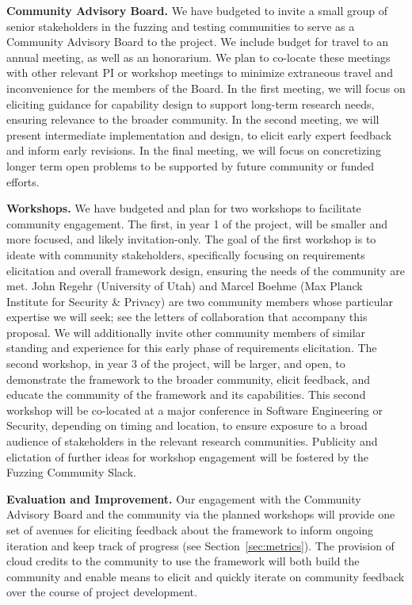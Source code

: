 \vspace{1ex}
\noindent\textbf{Community Advisory Board.} We have budgeted to invite a small group
of senior stakeholders in the fuzzing and testing communities to serve as a
Community Advisory Board to the project.  We include budget for travel to an
annual meeting, as well as an honorarium. We plan to co-locate these meetings with
other relevant PI or workshop meetings to minimize extraneous travel and
inconvenience for the members of the Board.  In the first meeting, we will focus
on eliciting guidance for capability design to support long-term research needs,
ensuring relevance to the broader community.  In the second meeting, we will
present intermediate implementation and design, to elicit early expert feedback
and inform early revisions.  In the final meeting, we will focus on concretizing
longer term open problems to be supported by future community or
funded efforts.


\vspace{1ex}
\noindent\textbf{Workshops.}  We have budgeted and plan for two workshops to
facilitate community engagement.  The first, in year 1 of the project, will be
smaller and more focused, and likely invitation-only. The goal of the first workshop is
to ideate with community stakeholders, specifically focusing on requirements
elicitation and overall framework design, ensuring the needs of the community
are met.  John Regehr (University of Utah) and Marcel Boehme (Max Planck
Institute for Security \& Privacy) are two community members whose particular
expertise we will seek; see the letters of collaboration that accompany this
proposal.  We will additionally invite other community members of similar
standing and experience for this early phase of requirements elicitation.   The
second workshop, in year 3 of the project, will be larger, and open, to demonstrate the
framework to the broader community, elicit feedback, and educate the community
of the framework and its capabilities.  This second workshop will be co-located
at a major conference in Software Engineering or Security, depending on timing
and location, to ensure exposure to a broad audience of stakeholders in the
relevant research communities.   Publicity and elictation of further
ideas for workshop engagement will be fostered by the Fuzzing
Community Slack.


\vspace{1ex}
\noindent\textbf{Evaluation and Improvement.} Our engagement with the Community
Advisory Board and the community via the planned workshops will provide one set
of avenues for eliciting feedback about the framework to inform ongoing
iteration and keep track of progress (see Section~\ref{sec:metrics}).  
The provision of cloud credits to the community
to use the framework will both build the community and enable means to elicit
and quickly iterate on community feedback over the course of project
development. 

